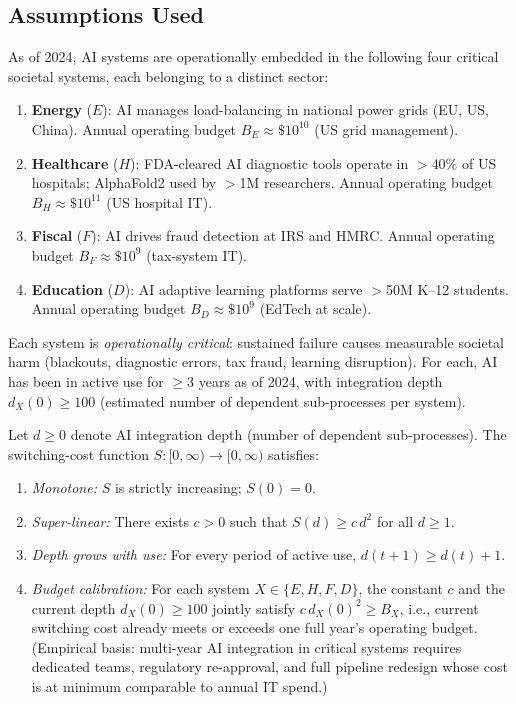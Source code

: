 

\subsection*{Assumptions Used}

\begin{assumption}\label{A3}
  As of 2024, AI systems are operationally embedded in the following four
  critical societal systems, each belonging to a distinct sector:
  \begin{enumerate}
    \item \textbf{Energy} ($E$): AI manages load-balancing in national
      power grids (EU, US, China).
      Annual operating budget $B_E \approx \$10^{10}$ (US grid management).
    \item \textbf{Healthcare} ($H$): FDA-cleared AI diagnostic tools operate
      in $>$40\% of US hospitals; AlphaFold2 used by $>$1M researchers.
      Annual operating budget $B_H \approx \$10^{11}$ (US hospital IT).
    \item \textbf{Fiscal} ($F$): AI drives fraud detection at IRS and HMRC.
      Annual operating budget $B_F \approx \$10^{9}$ (tax-system IT).
    \item \textbf{Education} ($D$): AI adaptive learning platforms serve
      $>$50M K--12 students.
      Annual operating budget $B_D \approx \$10^{9}$ (EdTech at scale).
  \end{enumerate}
  Each system is \emph{operationally critical}: sustained failure causes
  measurable societal harm (blackouts, diagnostic errors, tax fraud,
  learning disruption).  For each, AI has been in active use for
  $\geq 3$ years as of 2024, with integration depth $d_X(0) \geq 100$
  (estimated number of dependent sub-processes per system).
\end{assumption}

\begin{assumption}\label{A4}
  Let $d \geq 0$ denote AI integration depth (number of dependent
  sub-processes).  The switching-cost function $S : [0,\infty) \to [0,\infty)$
  satisfies:
  \begin{enumerate}
    \item \emph{Monotone:} $S$ is strictly increasing; $S(0) = 0$.
    \item \emph{Super-linear:} There exists $c > 0$ such that
      $S(d) \geq c\,d^2$ for all $d \geq 1$.
    \item \emph{Depth grows with use:} For every period of active use,
      $d(t+1) \geq d(t) + 1$.
    \item \emph{Budget calibration:} For each system $X \in \{E,H,F,D\}$,
      the constant $c$ and the current depth $d_X(0) \geq 100$ jointly
      satisfy $c\,d_X(0)^2 \geq B_X$, i.e., current switching cost
      already meets or exceeds one full year's operating budget.
      (Empirical basis: multi-year AI integration in critical systems
      requires dedicated teams, regulatory re-approval, and full pipeline
      redesign whose cost is at minimum comparable to annual IT spend.)
  \end{enumerate}
\end{assumption}

